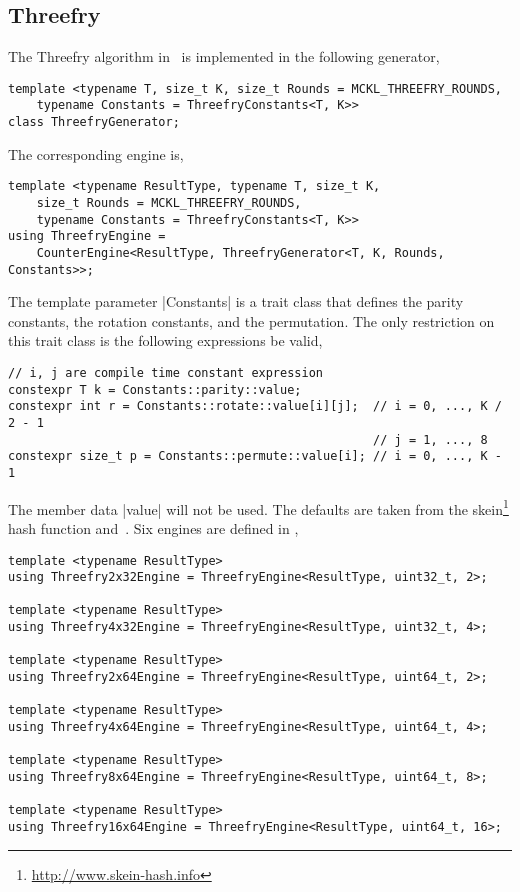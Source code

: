 \subsection{Threefry}
\label{sub:Threefry}

The Threefry algorithm in~\cite{Salmon:2011um} is implemented in the following
generator,
\begin{verbatim}
template <typename T, size_t K, size_t Rounds = MCKL_THREEFRY_ROUNDS,
    typename Constants = ThreefryConstants<T, K>>
class ThreefryGenerator;
\end{verbatim}
The corresponding \rng engine is,
\begin{verbatim}
template <typename ResultType, typename T, size_t K,
    size_t Rounds = MCKL_THREEFRY_ROUNDS,
    typename Constants = ThreefryConstants<T, K>>
using ThreefryEngine =
    CounterEngine<ResultType, ThreefryGenerator<T, K, Rounds, Constants>>;
\end{verbatim}
The template parameter |Constants| is a trait class that defines the parity
constants, the rotation constants, and the permutation. The only restriction on
this trait class is the following expressions be valid,
\begin{verbatim}
// i, j are compile time constant expression
constexpr T k = Constants::parity::value;
constexpr int r = Constants::rotate::value[i][j];  // i = 0, ..., K / 2 - 1
                                                   // j = 1, ..., 8
constexpr size_t p = Constants::permute::value[i]; // i = 0, ..., K - 1
\end{verbatim}
The member data |value| will not be \odr used. The defaults are taken
from the skein\footnote{\url{http://www.skein-hash.info}} hash function
and~\cite{Salmon:2011um}. Six engines are defined in \mckl,
\begin{verbatim}
template <typename ResultType>
using Threefry2x32Engine = ThreefryEngine<ResultType, uint32_t, 2>;

template <typename ResultType>
using Threefry4x32Engine = ThreefryEngine<ResultType, uint32_t, 4>;

template <typename ResultType>
using Threefry2x64Engine = ThreefryEngine<ResultType, uint64_t, 2>;

template <typename ResultType>
using Threefry4x64Engine = ThreefryEngine<ResultType, uint64_t, 4>;

template <typename ResultType>
using Threefry8x64Engine = ThreefryEngine<ResultType, uint64_t, 8>;

template <typename ResultType>
using Threefry16x64Engine = ThreefryEngine<ResultType, uint64_t, 16>;
\end{verbatim}
